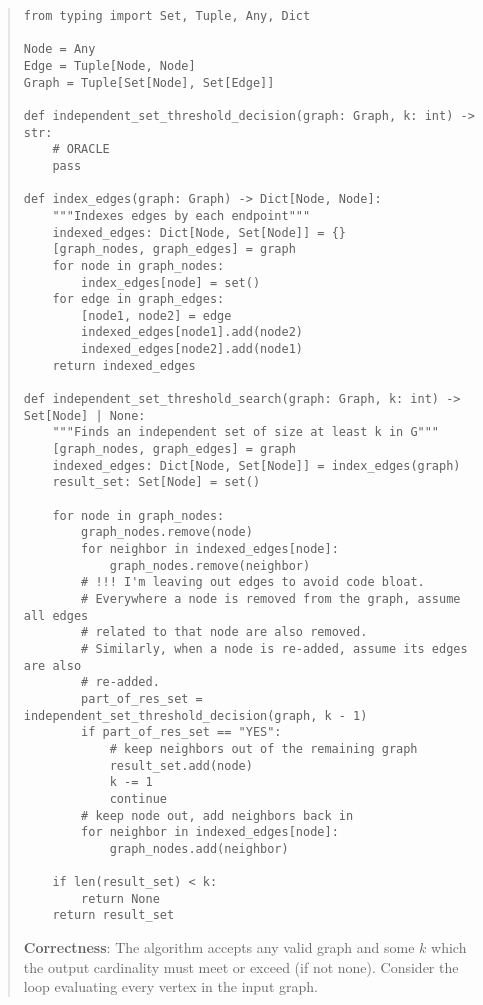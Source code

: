 \documentclass[11pt]{article}
\begin{document}
\begin{enumerate}
\begin{enumerate}
\begin{quote}
    \begin{verbatim}
from typing import Set, Tuple, Any, Dict

Node = Any
Edge = Tuple[Node, Node]
Graph = Tuple[Set[Node], Set[Edge]]

def independent_set_threshold_decision(graph: Graph, k: int) -> str:
    # ORACLE
    pass

def index_edges(graph: Graph) -> Dict[Node, Node]:
    """Indexes edges by each endpoint"""
    indexed_edges: Dict[Node, Set[Node]] = {}
    [graph_nodes, graph_edges] = graph
    for node in graph_nodes:
        index_edges[node] = set()
    for edge in graph_edges:
        [node1, node2] = edge
        indexed_edges[node1].add(node2)
        indexed_edges[node2].add(node1)
    return indexed_edges

def independent_set_threshold_search(graph: Graph, k: int) -> Set[Node] | None:
    """Finds an independent set of size at least k in G"""
    [graph_nodes, graph_edges] = graph
    indexed_edges: Dict[Node, Set[Node]] = index_edges(graph)
    result_set: Set[Node] = set()

    for node in graph_nodes:
        graph_nodes.remove(node)
        for neighbor in indexed_edges[node]:
            graph_nodes.remove(neighbor)
        # !!! I'm leaving out edges to avoid code bloat.
        # Everywhere a node is removed from the graph, assume all edges
        # related to that node are also removed.
        # Similarly, when a node is re-added, assume its edges are also
        # re-added.
        part_of_res_set = independent_set_threshold_decision(graph, k - 1)
        if part_of_res_set == "YES":
            # keep neighbors out of the remaining graph
            result_set.add(node)
            k -= 1
            continue
        # keep node out, add neighbors back in
        for neighbor in indexed_edges[node]:
            graph_nodes.add(neighbor)

    if len(result_set) < k:
        return None
    return result_set
    \end{verbatim}
    \vspace{1em}
    
    \textbf{Correctness}: \newline 
    The algorithm accepts any valid graph and some $k$ which the output cardinality must meet or exceed (if not none). Consider the loop evaluating every vertex in the input graph. \newline 
    

\end{quote}
\end{enumerate}
\end{enumerate}
\end{document}
